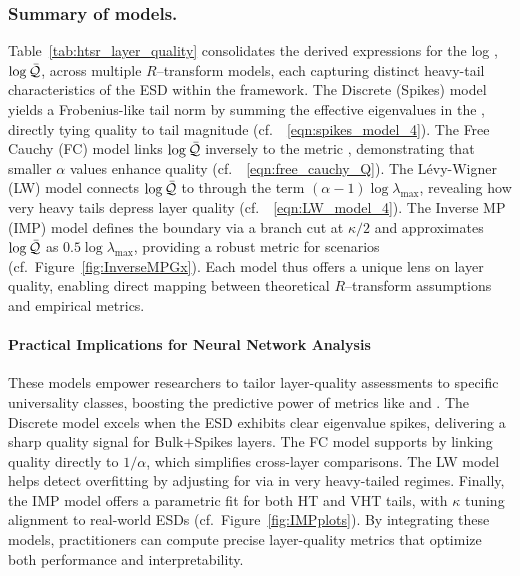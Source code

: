 \subsubsection{Summary of models.}

Table~\ref{tab:htsr_layer_quality} consolidates the derived expressions for the log \LayerQuality, \(\log\bar{\mathcal{Q}}\), across multiple \(R\)–transform models, each capturing distinct heavy-tail characteristics of the ESD within the \SETOL framework. The Discrete (Spikes) model yields a Frobenius-like tail norm by summing the effective eigenvalues in the \ECS, directly tying quality to tail magnitude (cf.\ \EQN~\ref{eqn:spikes_model_4}). The Free Cauchy (FC) model links \(\log\bar{\mathcal{Q}}\) inversely to the \HTSR metric \ALPHA, demonstrating that smaller \(\alpha\) values enhance quality (cf.\ \EQN~\ref{eqn:free_cauchy_Q}). The L\'evy-Wigner (LW) model connects \(\log\bar{\mathcal{Q}}\) to \ALPHAHAT through the term \((\alpha-1)\log\lambda_{\max}\), revealing how very heavy tails depress layer quality (cf.\ \EQN~\ref{eqn:LW_model_4}). The Inverse MP (IMP) model defines the \ECS boundary via a branch cut at \(\kappa/2\) and approximates \(\log\bar{\mathcal{Q}}\) as \(0.5\log\lambda_{\max}\), providing a robust metric for \IdealLearning scenarios (cf.\ Figure~\ref{fig:InverseMPGx}). Each model thus offers a unique lens on layer quality, enabling direct mapping between theoretical \(R\)–transform assumptions and empirical \WW metrics.

\paragraph{Practical Implications for Neural Network Analysis}
These models empower researchers to tailor layer-quality assessments to specific \HTSR universality classes, boosting the predictive power of \WW metrics like \ALPHA and \ALPHAHAT. The Discrete model excels when the ESD exhibits clear eigenvalue spikes, delivering a sharp quality signal for Bulk$+$Spikes layers. The FC model supports \IdealLearning by linking quality directly to \(1/\alpha\), which simplifies cross-layer comparisons. The LW model helps detect overfitting by adjusting for \CorrelationTraps via \ALPHAHAT in very heavy-tailed regimes. Finally, the IMP model offers a parametric fit for both HT and VHT tails, with \(\kappa\) tuning alignment to real-world ESDs (cf.\ Figure~\ref{fig:IMPplots}). By integrating these models, practitioners can compute precise layer-quality metrics that optimize both performance and interpretability.
